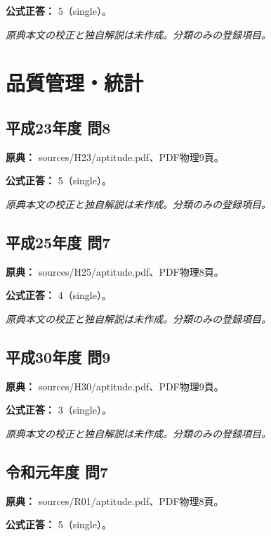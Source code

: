 \textbf{公式正答：} 5（single）。

\par\textit{原典本文の校正と独自解説は未作成。分類のみの登録項目。}

\section{品質管理・統計}

\subsection{平成23年度 問8}
\label{q:h23-reg-apt-08}

\noindent\textbf{原典：} sources/H23/aptitude.pdf、PDF物理9頁。

\textbf{公式正答：} 5（single）。

\par\textit{原典本文の校正と独自解説は未作成。分類のみの登録項目。}

\subsection{平成25年度 問7}
\label{q:h25-reg-apt-07}

\noindent\textbf{原典：} sources/H25/aptitude.pdf、PDF物理8頁。

\textbf{公式正答：} 4（single）。

\par\textit{原典本文の校正と独自解説は未作成。分類のみの登録項目。}

\subsection{平成30年度 問9}
\label{q:h30-reg-apt-09}

\noindent\textbf{原典：} sources/H30/aptitude.pdf、PDF物理9頁。

\textbf{公式正答：} 3（single）。

\par\textit{原典本文の校正と独自解説は未作成。分類のみの登録項目。}

\subsection{令和元年度 問7}
\label{q:r01-reg-apt-07}

\noindent\textbf{原典：} sources/R01/aptitude.pdf、PDF物理8頁。

\textbf{公式正答：} 5（single）。


